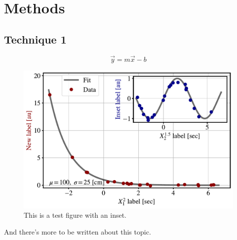 \section{Methods}
\kant[5-7]

\subsection{Technique 1}
\kant[10]

\begin{equation}\label{eq:equation_of_a_line}
\vec{y}=m\vec{x}-b
\end{equation}

\kant[11]

\begin{figure}[h]\label{fig:test_inset}
\begin{center}
\includegraphics[scale=0.75]{figures/test_inset.pdf}
\end{center}
\caption{This is a test figure with an inset.}
\end{figure}

\kant[12-13] And there's more to be written about this topic.~\cite{einstein}

